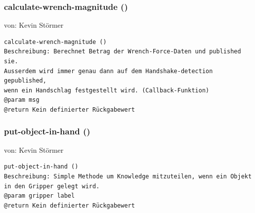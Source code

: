\documentclass{suturo}
\makeatletter
\newcommand{\chapterauthor}[1]{%
  {\parindent0pt\vspace*{-27pt}%
  \linespread{0}\small\begin{flushright}von: #1\end{flushright}%
  \par\nobreak\vspace*{0pt}}
  \@afterheading%
}
\makeatother
\begin{document}
\newpage

\subsubsection{calculate-wrench-magnitude ()}
\chapterauthor{Kevin Störmer}
\begin{verbatim}
calculate-wrench-magnitude ()
Beschreibung: Berechnet Betrag der Wrench-Force-Daten und published sie. 
Ausserdem wird immer genau dann auf dem Handshake-detection gepublished, 
wenn ein Handschlag festgestellt wird. (Callback-Funktion)
@param msg
@return Kein definierter Rückgabewert
\end{verbatim}

\begin{figure}[!htb]
\end{figure}


\subsubsection{put-object-in-hand ()}
\chapterauthor{Kevin Störmer}
\begin{verbatim}
put-object-in-hand ()
Beschreibung: Simple Methode um Knowledge mitzuteilen, wenn ein Objekt 
in den Gripper gelegt wird.
@param gripper label
@return Kein definierter Rückgabewert
\end{verbatim}
\end{document}

